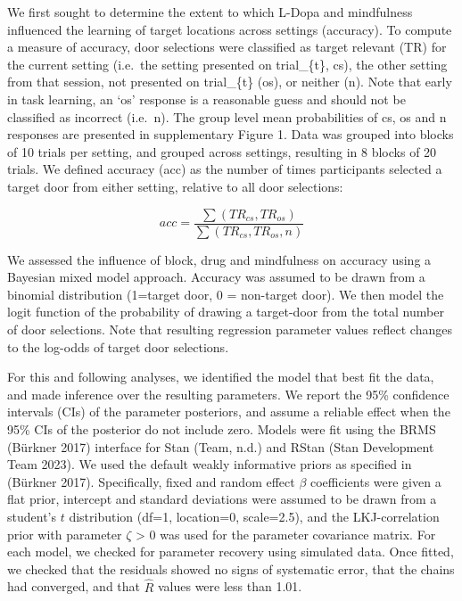 \documentclass{article}
\begin{document}
We first sought to determine the extent to which L-Dopa and mindfulness
influenced the learning of target locations across settings (accuracy).
To compute a measure of accuracy, door selections were classified as
target relevant (TR) for the current setting (i.e.~the setting presented
on trial\_\{t\}, cs), the other setting from that session, not presented
on trial\_\{t\} (os), or neither (n). Note that early in task learning,
an `os' response is a reasonable guess and should not be classified as
incorrect (i.e.~n). The group level mean probabilities of cs, os and n
responses are presented in supplementary Figure 1. Data was grouped into
blocks of 10 trials per setting, and grouped across settings, resulting
in 8 blocks of 20 trials. We defined accuracy (acc) as the number of
times participants selected a target door from either setting, relative
to all door selections:

\[
acc = \frac{\sum{(TR_{cs}, TR_{os})}}{\sum{(TR_{cs}, TR_{os}, n)}}
\]

We assessed the influence of block, drug and mindfulness on accuracy
using a Bayesian mixed model approach. Accuracy was assumed to be drawn
from a binomial distribution (1=target door, 0 = non-target door). We
then model the logit function of the probability of drawing a
target-door from the total number of door selections. Note that
resulting regression parameter values reflect changes to the log-odds of
target door selections.

For this and following analyses, we identified the model that best fit
the data, and made inference over the resulting parameters. We report
the 95\% confidence intervals (CIs) of the parameter posteriors, and
assume a reliable effect when the 95\% CIs of the posterior do not
include zero. Models were fit using the BRMS (Bürkner 2017) interface
for Stan (Team, n.d.) and RStan (Stan Development Team 2023). We used
the default weakly informative priors as specified in (Bürkner 2017).
Specifically, fixed and random effect \(\beta\) coefficients were given
a flat prior, intercept and standard deviations were assumed to be drawn
from a student's \(t\) distribution (df=1, location=0, scale=2.5), and
the LKJ-correlation prior with parameter \(\zeta\) \textgreater{} 0 was
used for the parameter covariance matrix. For each model, we checked for
parameter recovery using simulated data. Once fitted, we checked that
the residuals showed no signs of systematic error, that the chains had
converged, and that \(\hat{R}\) values were less than 1.01.
\end{document}
